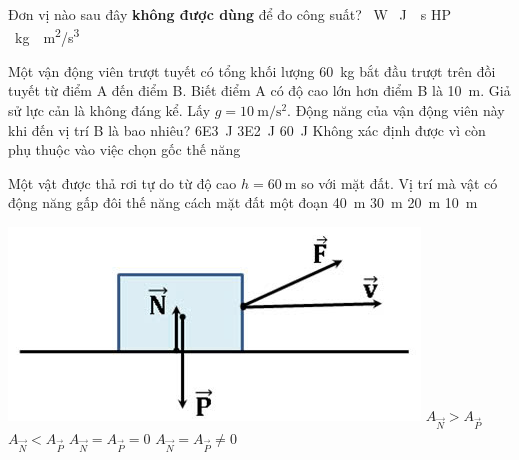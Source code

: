 \begin{ex}
	Đơn vị nào sau đây \textbf{không được dùng} để đo công suất?
	\choice
	{\SI{}{\watt}}
	{\True \SI{}{\joule \cdot \second}}
	{\si{HP}}
	{\SI{}{\kilogram \cdot \meter\squared / \second \cubed}}
	\loigiai{}
\end{ex}


\begin{ex}
	 Một vận động viên trượt tuyết có tổng khối lượng \SI{60}{\kilogram} bắt đầu trượt trên đồi tuyết từ điểm A đến điểm B. Biết điểm A có độ cao lớn hơn điểm B là \SI{10}{\meter}. Giả sử lực cản là không đáng kể. Lấy $g=\SI{10}{\meter/\second^2}$. Động năng của vận động viên này khi đến vị trí B là bao nhiêu?
	\choice
	{\True \SI{6E3}{\joule}}
	{\SI{3E2}{\joule}}
	{\SI{60}{\joule}}
	{Không xác định được vì còn phụ thuộc vào việc chọn gốc thế năng}
	\loigiai{}
\end{ex}
\begin{ex}
	Một vật được thả rơi tự do từ độ cao $h=\SI{60}{\meter}$ so với mặt đất. Vị trí mà vật có động năng gấp đôi thế năng cách mặt đất một đoạn
	\choice
	{\SI{40}{\meter}}
	{\SI{30}{\meter}}
	{\True \SI{20}{\meter}}
	{\SI{10}{\meter}}
	\loigiai{}
\end{ex}


\begin{ex}
	{\vspace{-0.5cm}\includegraphics[scale=0.3]{../figs/LTTHPT-TOPIC3-12}}
	\choice
	{\( A_{\vec{N}} > A_{\vec{P}}\)}
	{\( A_{\vec{N}} < A_{\vec{P}}\)}
	{\True \( A_{\vec{N}} = A_{\vec{P}}=0\)}
	{\( A_{\vec{N}} = A_{\vec{P}}\neq 0\)}
	\loigiai{}
\end{ex}

